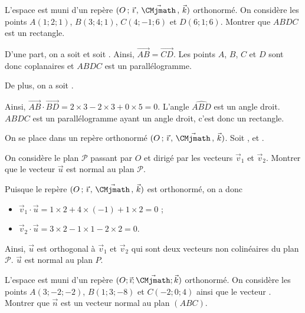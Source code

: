 \documentclass[11pt,fleqn, openany]{book} %
\begin{document}
\begin{exercise}L'espace est muni d'un repère $\Oijk$ orthonormé. On considère les points $A(1;2;1)$, $B(3;4;1)$, $C(4;-1;6)$ et $D(6;1;6)$. Montrer que $ABDC$ est un rectangle.\end{exercise}

\begin{solution}D'une part, on a  soit  et  soit . Ainsi, $\overrightarrow{AB}=\overrightarrow{CD}$. Les points $A$, $B$, $C$ et $D$ sont donc coplanaires et $ABDC$ est un parallélogramme.

De plus, on a  soit .

Ainsi, $\overrightarrow{AB} \cdot \overrightarrow{BD} = 2 \times 3 - 2 \times 3 + 0 \times 5 = 0$. L'angle $\widehat{ABD}$ est un angle droit. $ABDC$ est un parallélogramme ayant un angle droit, c'est donc un rectangle.\end{solution}




\begin{exercise}On se place dans un repère orthonormé $\Oijk$. Soit ,  et .

On considère le plan $\mathcal{P}$ passant par $O$ et dirigé par les vecteurs $\vec v_1$ et $\vec v_2$.  Montrer que le vecteur $\vec u$ est normal au plan $\mathcal{P}$.\end{exercise}

\begin{solution}Puisque le repère  $\Oijk$ est orthonormé, on a donc
\begin{itemize}
\item $\vec v_1 \cdot \vec u = 1 \times 2 + 4 \times (-1)+ 1\times 2=0$ ;
\item $\vec v_2 \cdot \vec u = 3 \times 2 - 1 \times 1 -2 \times 2 =0$.
\end{itemize}
Ainsi, $\vec u$ est orthogonal à $\vec v_1$ et $\vec v_2$ qui sont deux vecteurs non colinéaires du plan $\mathcal{P}$. $\vec u$ est normal au plan $P$.\end{solution}



\begin{exercise}
 L'espace est muni d'un repère $(O;\vec{\imath}; \vec{\CMjmath}; \vec k)$ orthonormé. On considère les points $A(3;-2;-2)$, $B(1;3;-8)$ et $C(-2;0;4)$ ainsi que le vecteur . Montrer que $\vec n$ est un vecteur normal au plan $(ABC)$.
\end{exercise}
\end{document}
